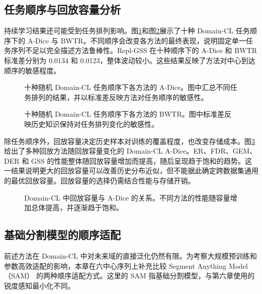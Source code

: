 \subsection{任务顺序与回放容量分析}

持续学习结果还可能受到任务排列影响。图\ref{fig:benchmark-order-adice}和图\ref{fig:benchmark-order-bwtr}展示了十种 Domain-CL 任务顺序下的 A-Dice 与 BWTR。不同顺序会改变各方法的最终表现，说明固定单一任务序列不足以完全描述方法鲁棒性。Repl-GSS 在十种顺序下的 A-Dice 和 BWTR 标准差分别为 0.0134 和 0.0123，整体波动较小。这些结果反映了方法对中心到达顺序的敏感程度。

\begin{figure}[htbp]
\centering
{}
\caption{十种随机 Domain-CL 任务顺序下各方法的 A-Dice。图中汇总不同任务排列的结果，并以标准差反映方法对任务顺序的敏感性。}
\label{fig:benchmark-order-adice}
\end{figure}

\begin{figure}[htbp]
\centering
{}
\caption{十种随机 Domain-CL 任务顺序下各方法的 BWTR。图中标准差反映历史知识保持对任务排列变化的敏感性。}
\label{fig:benchmark-order-bwtr}
\end{figure}

除任务顺序外，回放容量决定历史样本对训练的覆盖程度，也改变存储成本。图\ref{fig:benchmark-memory}给出了多种回放方法随回放容量变化的 Domain-CL A-Dice。ER、FDR、GEM、DER 和 GSS 的性能整体随回放容量增加而提高，随后呈现趋于饱和的趋势。这一结果说明更大的回放容量可以改善历史分布近似，但不能据此确定跨数据集通用的最优回放容量。回放容量的选择仍需结合性能与存储开销。

\begin{figure}[htbp]
\centering
{}
\caption{Domain-CL 中回放容量与 A-Dice 的关系。不同方法的性能随容量增加总体提高，并逐渐趋于饱和。}
\label{fig:benchmark-memory}
\end{figure}

\subsection{基础分割模型的顺序适配}
\label{sec:benchmark-extensions}

\label{subsec:benchmark-foundation-model}
前述方法在 Domain-CL 中对未来域的直接泛化仍然有限。为考察大规模预训练和参数高效适配的影响，本章在六中心序列上补充比较 Segment Anything Model（SAM）\cite{kirillov2023sam} 的两种顺序适配方式。这里的 SAM 指基础分割模型，与第六章使用的锐度感知最小化不同。

